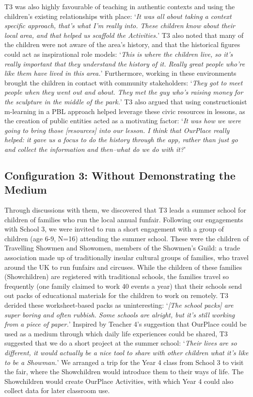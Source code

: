 T3 was also highly favourable of teaching in authentic contexts and using the children's existing relationships with place: `\textit{It was all about taking a context specific approach, that's what I'm really into. These children know about their local area, and that helped us scaffold the Activities.}' T3 also noted that many of the children were not aware of the area's history, and that the historical figures could act as inspirational role models: `\textit{This is where the children live, so it's really important that they understand the history of it. Really great people who're like them have lived in this area.}' Furthermore, working in these environments brought the children in contact with community stakeholders: `\textit{They got to meet people when they went out and about. They met the guy who's raising money for the sculpture in the middle of the park.}' T3 also argued that using constructionist m-learning in a PBL approach helped leverage these civic resources in lessons, as the creation of public entities acted as a motivating factor: `\textit{It was how we were going to bring those [resources] into our lesson. I think that OurPlace really helped: it gave us a focus to do the history through the app, rather than just go and collect the information and then--what do we do with it?}' 

\subsection{Configuration 3: Without Demonstrating the Medium}
Through discussions with them, we discovered that T3 leads a summer school for children of families who run the local annual funfair. Following our engagements with School 3, we were invited to run a short engagement with a group of children (age 6-9, N=16) attending the summer school. These were the children of Travelling Showmen and Showomen, members of the Showmen's Guild: a trade association made up of traditionally insular cultural groups of families, who travel around the UK to run funfairs and circuses. While the children of these families (Showchildren) are registered with traditional schools, the families travel so frequently (one family claimed to work 40 events a year) that their schools send out packs of educational materials for the children to work on remotely. T3 derided these worksheet-based packs as uninteresting: `\textit{[The school packs] are super boring and often rubbish. Some schools are alright, but it's still working from a piece of paper.}' Inspired by Teacher 4's suggestion that OurPlace could be used as a medium through which daily life experiences could be shared, T3 suggested that we do a short project at the summer school: `\textit{Their lives are so different, it would actually be a nice tool to share with other children what it's like to be a Showman.}' We arranged a trip for the Year 4 class from School 3 to visit the fair, where the Showchildren would introduce them to their ways of life. The Showchildren would create OurPlace Activities, with which Year 4 could also collect data for later classroom use.

